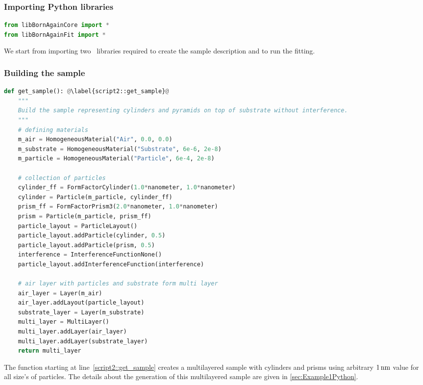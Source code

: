 \subsubsection*{Importing Python libraries}

\begin{lstlisting}[language=python, style=eclipseboxed]
from libBornAgainCore import *
from libBornAgainFit import *
\end{lstlisting}
We start from importing two \BornAgain\ libraries required to create
the sample description
and to run the fitting.

\subsubsection*{Building the sample}

\begin{lstlisting}[language=python, style=eclipseboxed, firstnumber=5]
def get_sample(): @\label{script2::get_sample}@
    """
    Build the sample representing cylinders and pyramids on top of substrate without interference.
    """
    # defining materials
    m_air = HomogeneousMaterial("Air", 0.0, 0.0)
    m_substrate = HomogeneousMaterial("Substrate", 6e-6, 2e-8)
    m_particle = HomogeneousMaterial("Particle", 6e-4, 2e-8)

    # collection of particles
    cylinder_ff = FormFactorCylinder(1.0*nanometer, 1.0*nanometer)
    cylinder = Particle(m_particle, cylinder_ff)
    prism_ff = FormFactorPrism3(2.0*nanometer, 1.0*nanometer)
    prism = Particle(m_particle, prism_ff)
    particle_layout = ParticleLayout()
    particle_layout.addParticle(cylinder, 0.5)
    particle_layout.addParticle(prism, 0.5)
    interference = InterferenceFunctionNone()
    particle_layout.addInterferenceFunction(interference)

    # air layer with particles and substrate form multi layer
    air_layer = Layer(m_air)
    air_layer.addLayout(particle_layout)
    substrate_layer = Layer(m_substrate)
    multi_layer = MultiLayer()
    multi_layer.addLayer(air_layer)
    multi_layer.addLayer(substrate_layer)
    return multi_layer
\end{lstlisting}
The function starting at line~\ref{script2::get_sample} creates a multilayered sample
with cylinders and prisms using arbitrary $1\,{\rm nm}$ value for all size's of particles.
The details about the generation of this multilayered sample are given in \cref{sec:Example1Python}.

